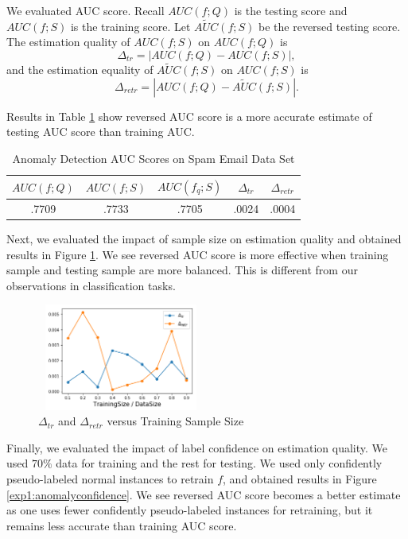 We evaluated AUC score. Recall $AUC(f; Q)$ is the 
testing score and $AUC(f; S)$ is the training score. 
Let $\widetilde{AUC}(f; S)$ be the reversed testing score. 
The estimation quality of $AUC(f; S)$ on $AUC(f; Q)$ is 
\begin{equation}
\Delta_{tr} = | AUC(f; Q) - AUC(f; S) |,  
\end{equation}
and the estimation equality of $\widetilde{AUC}(f; S)$ 
on $AUC(f; S)$ is 
\begin{equation}
\Delta_{retr} = | AUC(f; Q) - \widetilde{AUC}(f; S) |.  
\end{equation}

Results in Table \ref{exp1:anomalyaucscore} show 
reversed AUC score is a more accurate 
estimate of testing AUC score than training AUC. 

\begin{table}[h]
\renewcommand{\arraystretch}{1.5} 
\caption{Anomaly Detection AUC Scores on Spam Email Data Set}
\centering
\begin{tabular}{ccccc} \hline 
$AUC(f; Q)$ & $AUC(f; S)$ & $AUC(f_{q}; S)$ 
& $\Delta_{tr}$ & $\Delta_{retr}$ \\ \hline 
.7709 & .7733 & .7705 & .0024 & .0004 \\ \hline 
\end{tabular}
\label{exp1:anomalyaucscore}
\end{table}

Next, we evaluated the impact of sample size on 
estimation quality and obtained results in 
Figure \ref{exp1:anomalysamplesize}. 
We see reversed AUC score is more effective when 
training sample and testing sample are more balanced. 
This is different from our observations in 
classification tasks. 

\begin{figure}[h]
\centering
\includegraphics[width=5.5cm,height=3.5cm]{exp1_anomalysamplesize.png}
\vspace{-10pt}
\caption{$\Delta_{tr}$ and $\Delta_{retr}$ versus Training 
Sample Size} 
\label{exp1:anomalysamplesize}
\end{figure}

Finally, we evaluated the impact of label confidence 
on estimation quality. We used $70\%$ data for training 
and the rest for testing. 
We used only confidently pseudo-labeled normal instances 
to retrain $f$, 
and obtained results in Figure \ref{exp1:anomalyconfidence}. 
We see reversed AUC score becomes a better estimate 
as one uses fewer confidently pseudo-labeled instances 
for retraining, but it remains less accurate than 
training AUC score.  

